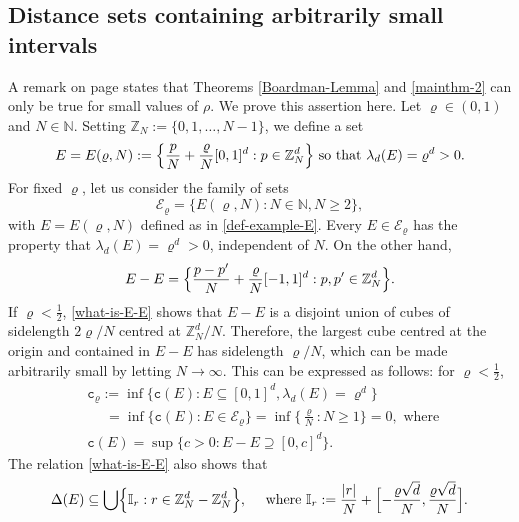 \documentclass[a4paper,11pt]{amsart}
\numberwithin{equation}{section}
\begin{document}
\subsection{Distance sets containing arbitrarily small intervals} \label{Appendix-3} 
A remark on page \pageref{small-rho-needed} states that Theorems \ref{Boardman-Lemma} and \ref{mainthm-2} can only be true for small values of $\rho$. We prove this assertion here.    
\vskip0.1in
\noindent Let $\varrho \in (0,1)$ and $N \in \mathbb N$. Setting $\mathbb Z_N := \{0, 1, \ldots, N-1\}$, we define a set
 \begin{equation} \label{def-example-E} 
 E = E(\varrho, N) := \Bigl\{\frac{p}{N} + \frac{\varrho}{N}[0, 1]^d : p \in \mathbb Z_N^{d} \Bigr\} \text{ so that } \lambda_d(E) = \varrho^d > 0. \end{equation}  
For fixed $\varrho$, let us consider the family of sets 
\[ \mathscr{E}_{\varrho} = \{E(\varrho, N) :  N \in \mathbb N, N \geq 2 \}, \] 
with $E = E(\varrho, N)$ defined as in \eqref{def-example-E}. Every $E \in \mathscr{E}_{\varrho}$ has the property that $\lambda_d(E) = \varrho^d > 0$, independent of $N$. On the other hand, 
 \begin{equation} E - E = \Bigl\{\frac{p-p'}{N} + \frac{\varrho}{N}[-1,1]^d : p, p' \in \mathbb Z_N^d \Bigr\}. \label{what-is-E-E} 
 \end{equation} 
If $\varrho < \frac{1}{2}$, \eqref{what-is-E-E} shows that $E -E$  is a disjoint union of cubes of sidelength $2\varrho/N$ centred at $\mathbb Z_N^d/N$. 
Therefore, the largest cube centred at the origin and contained in $E -E$ has sidelength $\varrho/N$, which can be made arbitrarily small by letting $N \rightarrow \infty$. This can be expressed as follows: for $\varrho < \frac{1}{2}$, 
\begin{align} 
&\mathtt c_{\varrho} := \inf \bigl\{ \mathtt c(E) : E \subseteq [0,1]^d, \lambda_d(E)  = \varrho^d  \bigr\}  \nonumber \\ &\quad \; = \inf \bigl\{\mathtt c(E) : E \in \mathscr{E}_{\varrho} \bigr\} = \inf\bigl\{\frac{\varrho}{N} : N \geq 1\bigr\} = 0, \text{ where } \label{c0} \\ 
&\mathtt c(E) = \sup \bigl\{c > 0 : E - E \supseteq [0, c]^d \bigr\}. \nonumber 
\end{align} 
 The relation \eqref{what-is-E-E} also shows that
 \begin{equation}   
 \Delta(E) \subseteq \bigcup \Bigl\{ \mathbb I_r : r \in \mathbb Z_N^d - \mathbb Z_N^d \Big\}, \quad \text{ where } \mathbb I_r := \frac{|r|}{N} + \Bigl[ -\frac{\varrho \sqrt{d}}{N}, \frac{\varrho \sqrt{d}}{N} \Bigr]. \nonumber
 \end{equation} 
\end{document}

